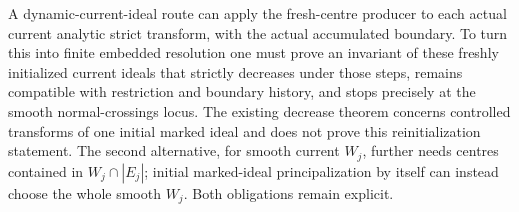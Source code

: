 A dynamic-current-ideal route can apply the fresh-centre producer to each
actual current analytic strict transform, with the actual accumulated
boundary. To turn this into finite embedded resolution one must prove an
invariant of these freshly initialized current ideals that strictly
decreases under those steps, remains compatible with restriction and boundary
history, and stops precisely at the smooth normal-crossings locus. The
existing decrease theorem concerns controlled transforms of one initial
marked ideal and does not prove this reinitialization statement.
The second alternative, for smooth current $W_j$, further needs centres
contained in $W_j\cap|E_j|$; initial marked-ideal principalization by itself
can instead choose the whole smooth $W_j$. Both obligations remain explicit.
